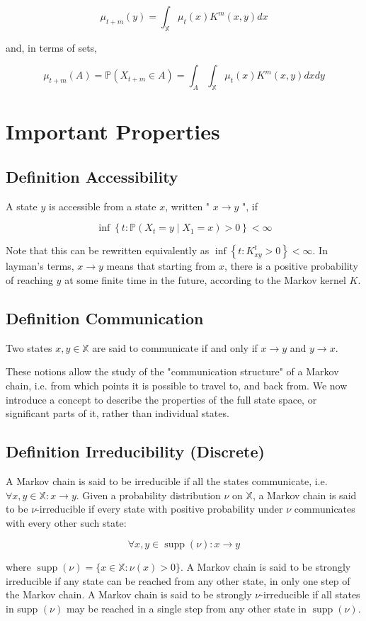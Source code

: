 \documentclass[10pt]{article}
\begin{document}
$$
\mu_{t+m}(y)=\int_{\mathbb{X}} \mu_{t}(x) K^{m}(x, y) d x
$$

and, in terms of sets,

$$
\mu_{t+m}(A)=\mathbb{P}\left(X_{t+m} \in A\right)=\int_{A} \int_{\mathbb{X}} \mu_{t}(x) K^{m}(x, y) d x d y
$$


\section{Important Properties}
\subsection{Definition Accessibility}
A state $y$ is accessible from a state $x$, written " $x \rightarrow y$ ", if

$$
\inf \left\{t: \mathbb{P}\left(X_{t}=y \mid X_{1}=x\right)>0\right\}<\infty
$$

Note that this can be rewritten equivalently as $\inf \left\{t: K_{x y}^{t}>0\right\}<\infty$. In layman's terms, $x \rightarrow y$ means that starting from $x$, there is a positive probability of reaching $y$ at some finite time in the future, according to the Markov kernel $K$.
\subsection{Definition Communication}
Two states $x, y \in \mathbb{X}$ are said to communicate if and only if $x \rightarrow y$ and $y \rightarrow x$.

These notions allow the study of the "communication structure" of a Markov chain, i.e. from which points it is possible to travel to, and back from. We now introduce a concept to describe the properties of the full state space, or significant parts of it, rather than individual states.
\subsection{Definition Irreducibility (Discrete)}
A Markov chain is said to be irreducible if all the states communicate, i.e. $\forall x, y \in \mathbb{X}: x \rightarrow y$. Given a probability distribution $\nu$ on $\mathbb{X}$, a Markov chain is said to be $\nu$-irreducible if every state with positive probability under $\nu$ communicates with every other such state:

$$
\forall x, y \in \operatorname{supp}(\nu): x \rightarrow y
$$

where $\operatorname{supp}(\nu)=\{x \in \mathbb{X}: \nu(x)>0\}$. A Markov chain is said to be strongly irreducible if any state can be reached from any other state, in only one step of the Markov chain. A Markov chain is said to be strongly $\nu$-irreducible if all states in supp $(\nu)$ may be reached in a single step from any other state in $\operatorname{supp}(\nu)$.
\end{document}
